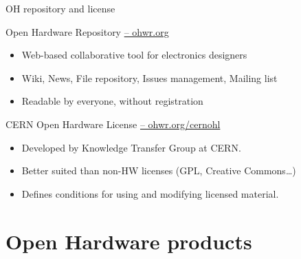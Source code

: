 \documentclass[compress,red]{beamer}
\begin{document}
\begin{frame}{OH repository and license}

  \begin{block}{Open Hardware Repository \href{http://ohwr.org}{-- ohwr.org}}
    \begin{itemize}
    \item Web-based collaborative tool for electronics designers
    \item Wiki, News, File repository, Issues management, Mailing list
    \item Readable by everyone, without registration
   \end{itemize}
  \end{block}

  \begin{block}{CERN Open Hardware License \href{http://ohwr.org/cernohl}{-- ohwr.org/cernohl}}
    \begin{itemize}
    \item Developed by Knowledge Transfer Group at CERN.
    \item Better suited than non-HW licenses (GPL, Creative Commons\dots)
    \item Defines conditions for using and modifying licensed material.
   \end{itemize}
  \end{block}


\end{frame}



\section[OH products]{Open Hardware products}

\subsection*{} %
\end{document}
